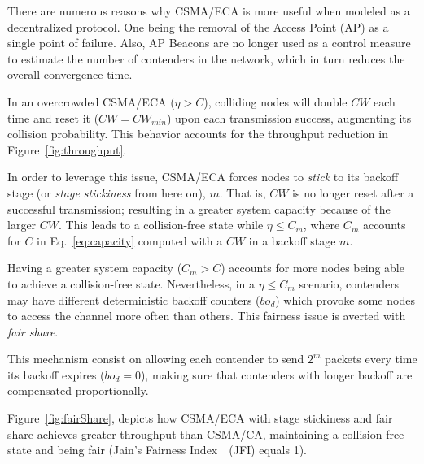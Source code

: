 There are numerous reasons why CSMA/ECA is more useful when modeled as a decentralized protocol. One being the removal of the Access Point (AP) as a single point of failure. Also, AP Beacons are no longer used as a control measure to estimate the number of contenders in the network, which in turn reduces the overall convergence time.


In an overcrowded CSMA/ECA ($\eta>C$), colliding nodes will double $CW$ each time and reset it ($CW=CW_{min}$) upon each transmission success, augmenting its collision probability. This behavior accounts for the throughput reduction in Figure~\ref{fig:throughput}.

In order to leverage this issue, CSMA/ECA forces nodes to \emph{stick} to its backoff stage (or \emph{stage stickiness} from here on), $m$. That is, $CW$ is no longer reset after a successful transmission; resulting in a greater system capacity because of the larger $CW$. This leads to a collision-free state while $\eta\leq C_{m}$, where $C_{m}$ accounts for $C$ in Eq.~\ref{eq:capacity} computed with a $CW$ in a backoff stage $m$.

Having a greater system capacity ($C_{m} > C$) accounts for more nodes being able to achieve a collision-free state. Nevertheless, in a $\eta\leq C_{m}$ scenario, contenders may have different deterministic backoff counters ($bo_{d}$) which provoke some nodes to access the channel more often than others. This fairness issue is averted with \emph{fair share}.

This mechanism consist on allowing each contender to send $2^{m}$ packets every time its backoff expires ($bo_{d}=0$), making sure that contenders with longer backoff are compensated proportionally.

Figure~\ref{fig:fairShare}, depicts how CSMA/ECA with stage stickiness and fair share achieves greater throughput than CSMA/CA, maintaining a collision-free state and being fair (Jain's Fairness Index~\cite{JFI}~(JFI) equals 1).


